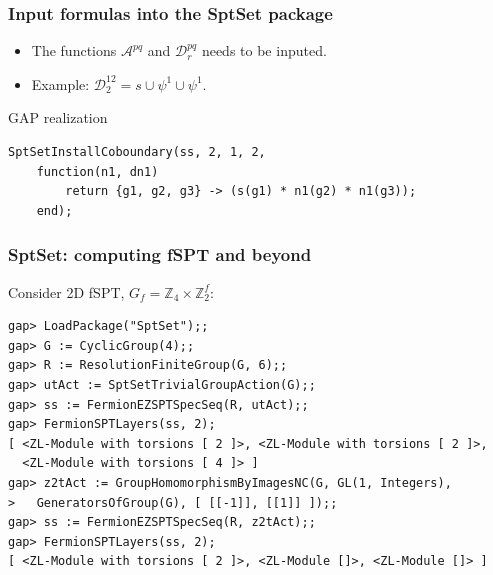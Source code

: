 \documentclass[xcolor=table, aspectratio=169]{beamer}
\begin{document}
\begin{frame}[fragile]
	\frametitle{Input formulas into the SptSet package}
	\begin{itemize}
		\item The functions $\mathcal A^{pq}$ and $\mathcal D^{pq}_r$ needs to be inputed.
		\item Example: $\mathcal D_2^{12} = s\cup\psi^1\cup\psi^1$.
	\end{itemize}

	\begin{block}{GAP realization}
	\begin{lstlisting}[basicstyle=\footnotesize]
	SptSetInstallCoboundary(ss, 2, 1, 2,
	function(n1, dn1)
		return {g1, g2, g3} -> (s(g1) * n1(g2) * n1(g3));
	end);
	\end{lstlisting}
	\end{block}

\end{frame}

\begin{frame}[fragile]
	\frametitle{SptSet: computing fSPT and beyond}
	Consider 2D fSPT, $G_f=\mathbb Z_4\times\mathbb Z_2^f$:
\begin{lstlisting}[basicstyle=\footnotesize]
gap> LoadPackage("SptSet");;
gap> G := CyclicGroup(4);;
gap> R := ResolutionFiniteGroup(G, 6);;
gap> utAct := SptSetTrivialGroupAction(G);;
gap> ss := FermionEZSPTSpecSeq(R, utAct);;
gap> FermionSPTLayers(ss, 2);
[ <ZL-Module with torsions [ 2 ]>, <ZL-Module with torsions [ 2 ]>,
  <ZL-Module with torsions [ 4 ]> ]
gap> z2tAct := GroupHomomorphismByImagesNC(G, GL(1, Integers),
>   GeneratorsOfGroup(G), [ [[-1]], [[1]] ]);;
gap> ss := FermionEZSPTSpecSeq(R, z2tAct);;
gap> FermionSPTLayers(ss, 2);
[ <ZL-Module with torsions [ 2 ]>, <ZL-Module []>, <ZL-Module []> ]
\end{lstlisting}

\end{frame}
\end{document}
